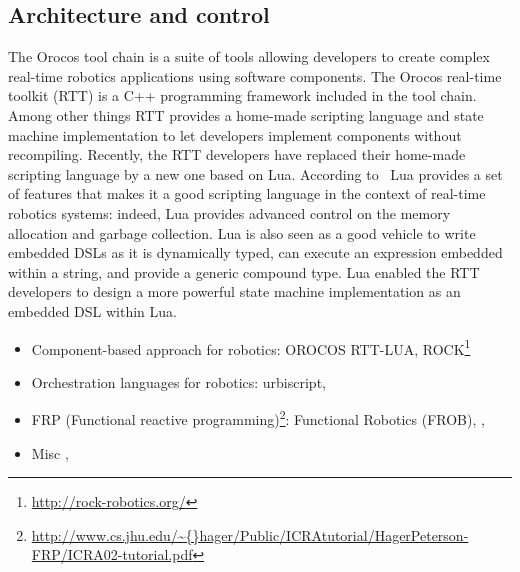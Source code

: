 \subsection{Architecture and control}

The Orocos tool chain is a suite of tools allowing developers to
create complex real-time robotics applications using software
components. The Orocos real-time toolkit (RTT) is a C++ programming
framework included in the tool chain. Among other things RTT provides
a home-made scripting language and state machine implementation to let
developers implement components without recompiling. Recently, the RTT
developers have replaced their home-made scripting language by a new
one based on Lua. According to~\cite{Klotzbucher:2010fk} Lua provides
a set of features that makes it a good scripting language in the
context of real-time robotics systems: indeed, Lua provides advanced
control on the memory allocation and garbage collection. Lua is also
seen as a good vehicle to write embedded DSLs as it is dynamically
typed, can execute an expression embedded within a string, and provide
a generic compound type. Lua enabled the RTT developers to design a
more powerful state machine implementation as an embedded DSL within
Lua.

\begin{itemize}
\item Component-based approach for robotics: OROCOS
  RTT-LUA\cite{Klotzbucher:2010fk},
  ROCK\footnote{\url{http://rock-robotics.org/}} \cite{Joyeux:2011fk}
\item Orchestration languages for robotics:
  urbiscript\cite{Baillie:2005},
\item FRP (Functional reactive
  programming)\footnote{\url{http://www.cs.jhu.edu/\~{}hager/Public/ICRAtutorial/HagerPeterson-FRP/ICRA02-tutorial.pdf}}:
  Functional Robotics (FROB)\cite{Hager:1999fk},
  \cite{Peterson:1999lk}, \cite{Pembeci:2002fc}
\item Misc \cite{Thiry:2008ys}, \cite{Proetzsch:2010vn}
\end{itemize}

